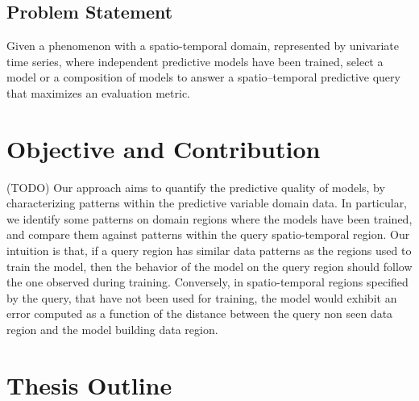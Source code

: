 \subsection{Problem Statement}
\label{Sec:ProblemStatement}

Given a phenomenon with a spatio-temporal domain, represented by univariate time series, where independent predictive models have been trained, select a model or a composition of models to answer a spatio--temporal predictive query that maximizes an evaluation metric.
%		


\section{Objective and Contribution}
\label{Sec:ObjectiveContribution}

(TODO) Our approach aims to quantify the predictive quality of models, by characterizing patterns within the predictive variable domain data. In particular, we identify some patterns on domain regions where the models have been trained, and compare them against patterns within the query spatio-temporal region. Our intuition is that, if a query region has similar data patterns as the regions used to train the model, then the behavior of the model on the query region should follow the one observed during training.
Conversely, in spatio-temporal regions specified by the query, that have not been used for training, the model would exhibit an error computed as a function of the distance between the query non seen data region and the model building data region.




\section{Thesis Outline}
\label{Sec:ThesisOutline}
